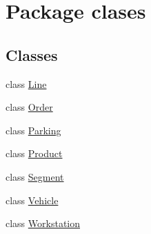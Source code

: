\hypertarget{namespaceclases}{}\section{Package clases}
\label{namespaceclases}
\subsection*{Classes}
\begin{DoxyCompactItemize}
\item 
class \mbox{\hyperlink{classclases_1_1_line}{Line}}
\item 
class \mbox{\hyperlink{classclases_1_1_order}{Order}}
\item 
class \mbox{\hyperlink{classclases_1_1_parking}{Parking}}
\item 
class \mbox{\hyperlink{classclases_1_1_product}{Product}}
\item 
class \mbox{\hyperlink{classclases_1_1_segment}{Segment}}
\item 
class \mbox{\hyperlink{classclases_1_1_vehicle}{Vehicle}}
\item 
class \mbox{\hyperlink{classclases_1_1_workstation}{Workstation}}
\end{DoxyCompactItemize}
